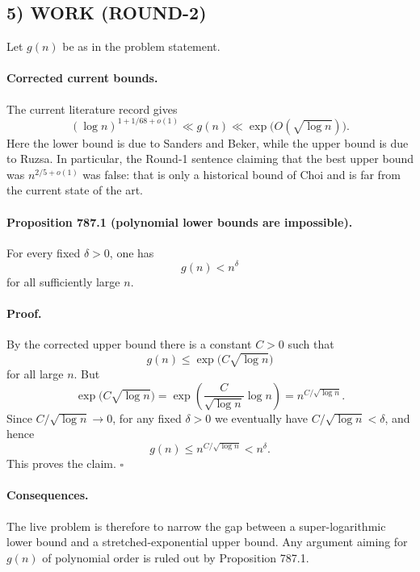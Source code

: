 \subsection*{5) WORK (ROUND-2)}
Let $g(n)$ be as in the problem statement.

\paragraph{Corrected current bounds.}
The current literature record gives
\[
 (\log n)^{1+1/68+o(1)} \ll g(n) \ll \exp\!\bigl(O(\sqrt{\log n})\bigr).
\]
Here the lower bound is due to Sanders and Beker, while the upper bound is due to Ruzsa. In particular, the Round-1 sentence claiming that the best upper bound was $n^{2/5+o(1)}$ was false: that is only a historical bound of Choi and is far from the current state of the art.

\paragraph{Proposition 787.1 (polynomial lower bounds are impossible).}
For every fixed $\delta>0$, one has
\[
 g(n) < n^{\delta}
\]
for all sufficiently large $n$.

\paragraph{Proof.}
By the corrected upper bound there is a constant $C>0$ such that
\[
 g(n) \le \exp\!\bigl(C\sqrt{\log n}\bigr)
\]
for all large $n$. But
\[
 \exp\!\bigl(C\sqrt{\log n}\bigr)
 = \exp\!\left(\frac{C}{\sqrt{\log n}} \log n\right)
 = n^{C/\sqrt{\log n}}.
\]
Since $C/\sqrt{\log n} \to 0$, for any fixed $\delta>0$ we eventually have $C/\sqrt{\log n} < \delta$, and hence
\[
 g(n) \le n^{C/\sqrt{\log n}} < n^{\delta}.
\]
This proves the claim.
\hfill$\square$

\paragraph{Consequences.}
The live problem is therefore to narrow the gap between a super-logarithmic lower bound and a stretched-exponential upper bound. Any argument aiming for $g(n)$ of polynomial order is ruled out by Proposition 787.1.

